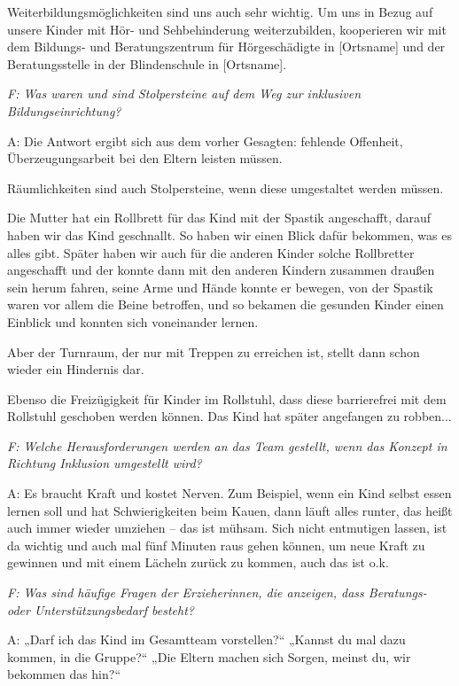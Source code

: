 \begin{linenumbers*}
 Weiterbildungsmöglichkeiten sind uns auch sehr wichtig. 
Um uns in Bezug auf unsere Kinder mit Hör- und Sehbehinderung weiterzubilden, kooperieren wir mit dem Bildungs- und Beratungszentrum für Hörgeschädigte in {[Ortsname]} und der Beratungsstelle in der Blindenschule in {[Ortsname]}.   

\emph{F: Was waren und sind Stolpersteine auf dem Weg zur inklusiven Bildungseinrichtung?} 

A: Die Antwort ergibt sich aus dem vorher Gesagten: fehlende Offenheit, Überzeugungsarbeit bei den Eltern leisten müssen.  

Räumlichkeiten sind auch Stolpersteine, wenn diese umgestaltet werden müssen.
 
Die Mutter hat ein Rollbrett für das Kind mit der Spastik angeschafft, darauf haben wir das Kind geschnallt. So haben wir einen Blick dafür bekommen, was es alles gibt. Später haben wir auch für die anderen Kinder solche Rollbretter angeschafft und der konnte dann mit den anderen Kindern zusammen draußen sein herum fahren, seine Arme und Hände konnte er bewegen, von der Spastik waren vor allem die Beine betroffen, und so bekamen die gesunden Kinder einen Einblick und konnten sich voneinander lernen. 
 
Aber der Turnraum, der nur mit Treppen zu erreichen ist, stellt dann schon wieder ein Hindernis dar.

Ebenso die Freizügigkeit für Kinder im Rollstuhl, dass diese barrierefrei mit dem Rollstuhl geschoben werden können. 
Das Kind hat später angefangen zu robben...

\emph{F: Welche Herausforderungen werden an das Team gestellt, wenn das Konzept in Richtung Inklusion umgestellt wird?}

A: Es braucht Kraft und kostet Nerven. Zum Beispiel, wenn ein Kind selbst essen lernen soll und hat Schwierigkeiten beim Kauen, dann läuft alles runter, das heißt auch immer wieder umziehen -- das ist mühsam. Sich nicht entmutigen lassen, ist da wichtig und auch mal fünf Minuten raus gehen können, um neue Kraft zu gewinnen und mit einem Lächeln zurück zu kommen, auch das ist o.k.  

\emph{F: Was sind häufige Fragen der Erzieherinnen, die anzeigen, dass Beratungs- oder Unterstützungsbedarf besteht?}

A: „Darf ich das Kind im Gesamtteam vorstellen?“ „Kannst du mal dazu kommen, in die Gruppe?“ „Die Eltern machen sich Sorgen, meinst du, wir bekommen das hin?“  


\end{linenumbers*}

